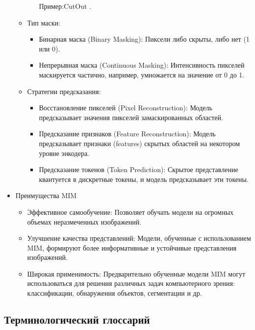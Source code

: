 \begin{itemize}
\begin{itemize}
\begin{itemize}
                Пример:CutOut \cite{devries2017improved}.
            \end{itemize}
        \item Тип маски:
            \begin{itemize}
                \item Бинарная маска (Binary Masking): Пиксели либо скрыты, либо нет (1 или 0).
                \item Непрерывная маска (Continuous Masking): Интенсивность пикселей маскируется частично, например, умножается на значение от 0 до 1.
            \end{itemize}
        \item Стратегии предсказания:
            \begin{itemize}
                \item Восстановление пикселей (Pixel Reconstruction): Модель предсказывает значения пикселей замаскированных областей.
                \item Предсказание признаков (Feature Reconstruction): Модель предсказывает признаки (features) скрытых областей на некотором уровне энкодера. 
                \item Предсказание токенов (Token Prediction): Скрытое представление квантуется в дискретные токены, и модель предсказывает эти токены.
            \end{itemize}
    \end{itemize}

    \item{Преимущества MIM}
    \begin{itemize}
        \item Эффективное самообучение: Позволяет обучать модели на огромных объемах неразмеченных изображений.
        \item Улучшение качества представлений: Модели, обученные с использованием MIM, формируют более информативные и устойчивые представления изображений.
        \item Широкая применимость: Предварительно обученные модели MIM могут использоваться для решения различных задач компьютерного зрения: классификации, обнаружения объектов, сегментации и др.
    \end{itemize}
\end{itemize}
\subsection{Терминологический глоссарий}

